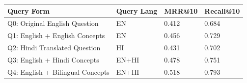 \begin{tabular}{llll}
\toprule
Query Form & Query Lang & MRR@10 & Recall@10 \\
\midrule
Q0: Original English Question & EN & 0.412 & 0.684 \\
Q1: English + English Concepts & EN & 0.456 & 0.729 \\
Q2: Hindi Translated Question & HI & 0.431 & 0.702 \\
Q3: English + Hindi Concepts & EN+HI & 0.478 & 0.751 \\
Q4: English + Bilingual Concepts & EN+HI & 0.518 & 0.793 \\
\bottomrule
\end{tabular}
